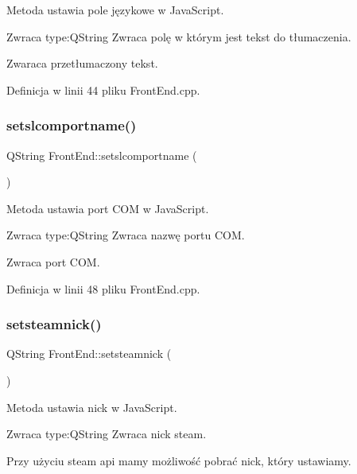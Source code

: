 Metoda ustawia pole językowe w Java\+Script. \begin{DoxyReturn}{Zwraca}
type\+:Q\+String Zwraca polę w którym jest tekst do tłumaczenia. 
\end{DoxyReturn}
Zwaraca przetłumaczony tekst. 

Definicja w linii 44 pliku Front\+End.\+cpp.

\mbox{\label{class_front_end_space_1_1_front_end_a22a63f3d5d496883ff44f8cd67aa4803}} 
\subsubsection{\texorpdfstring{setslcomportname()}{setslcomportname()}}
{\footnotesize\ttfamily Q\+String Front\+End\+::setslcomportname (\begin{DoxyParamCaption}{ }\end{DoxyParamCaption})}

Metoda ustawia port C\+OM w Java\+Script. \begin{DoxyReturn}{Zwraca}
type\+:Q\+String Zwraca nazwę portu C\+OM. 
\end{DoxyReturn}
Zwraca port C\+OM. 

Definicja w linii 48 pliku Front\+End.\+cpp.

\mbox{\label{class_front_end_space_1_1_front_end_aff724e4666bfe62874ccb2cca78a7316}} 
\subsubsection{\texorpdfstring{setsteamnick()}{setsteamnick()}}
{\footnotesize\ttfamily Q\+String Front\+End\+::setsteamnick (\begin{DoxyParamCaption}{ }\end{DoxyParamCaption})}

Metoda ustawia nick w Java\+Script. \begin{DoxyReturn}{Zwraca}
type\+:Q\+String Zwraca nick steam. 
\end{DoxyReturn}
Przy użyciu steam api mamy możliwość pobrać nick, który ustawiamy. 

